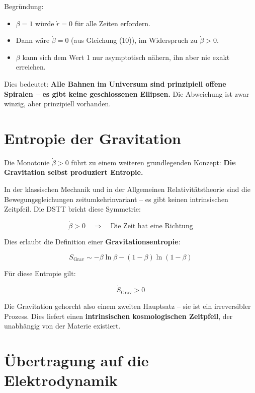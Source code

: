 \documentclass[12pt,a4paper]{article}
\begin{document}
Begründung:
\begin{itemize}
    \item \(\beta = 1\) würde \(\dot{r} = 0\) für alle Zeiten erfordern.
    \item Dann wäre \(\dot{\beta} = 0\) (aus Gleichung (10)), im Widerspruch zu \(\dot{\beta} > 0\).
    \item \(\beta\) kann sich dem Wert 1 nur asymptotisch nähern, ihn aber nie exakt erreichen.
\end{itemize}

Dies bedeutet:  
\textbf{Alle Bahnen im Universum sind prinzipiell offene Spiralen – es gibt keine geschlossenen Ellipsen.}  
Die Abweichung ist zwar winzig, aber prinzipiell vorhanden.

\section{Entropie der Gravitation}

Die Monotonie \(\dot{\beta} > 0\) führt zu einem weiteren grundlegenden Konzept:  
\textbf{Die Gravitation selbst produziert Entropie.}

In der klassischen Mechanik und in der Allgemeinen Relativitätstheorie sind die Bewegungsgleichungen zeitumkehrinvariant – es gibt keinen intrinsischen Zeitpfeil. Die DSTT bricht diese Symmetrie:

\begin{equation}
\dot{\beta} > 0 \quad \Rightarrow \quad \text{Die Zeit hat eine Richtung}
\end{equation}

Dies erlaubt die Definition einer \textbf{Gravitationsentropie}:

\begin{equation}
S_{\text{Grav}} \sim -\beta \ln \beta - (1-\beta) \ln(1-\beta)
\end{equation}

Für diese Entropie gilt:

\begin{equation}
\dot{S}_{\text{Grav}} > 0
\end{equation}

Die Gravitation gehorcht also einem zweiten Hauptsatz – sie ist ein irreversibler Prozess.  
Dies liefert einen \textbf{intrinsischen kosmologischen Zeitpfeil}, der unabhängig von der Materie existiert.

\section{Übertragung auf die Elektrodynamik}
\end{document}
